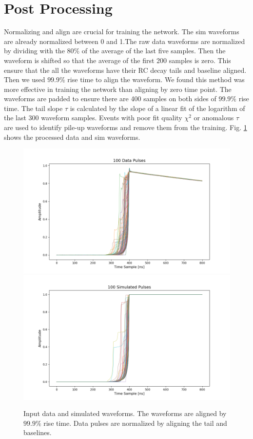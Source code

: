 \section{Post Processing}

Normalizing and align are crucial for training the network. The sim waveforms are already normalized between 0 and 1.The raw data waveforms are normalized by dividing with the $80\%$ of the average of the last five samples. Then the waveform is shifted so that the average of the first 200 samples is zero. This ensure that the all the waveforms have their RC decay tails and baseline aligned. Then we used $99.9\%$ rise time to align the waveform. We found this method was more effective in training the network than aligning by zero time point. The waveforms are padded to ensure there are 400 samples on both sides of $99.9\%$ rise time. The tail slope $\tau$ is calculated by the slope of a linear fit of the logarithm of the last 300 waveform samples. Events with poor fit quality $\chi^2$ or anomalous $\tau$ are used to identify pile-up waveforms and remove them from the training. Fig. \ref{ch7:figs:in_out} shows the processed data and sim waveforms.

\begin{figure}[!htb]
    \includegraphics[width=0.95\linewidth,trim={0pc 0cm 0pc 1cm},clip]{ch7/figs/all_data_pulses.png}
    \includegraphics[width=0.95\linewidth,trim={0pc 0cm 0pc 1cm},clip]{ch7/figs/all_simulated_pulses.png}
    \caption{Input data and simulated waveforms. The waveforms are aligned by $99.9\%$ rise time. Data pulses are normalized by aligning the tail and baselines.}
   \label{ch7:figs:in_out}
\end{figure}


